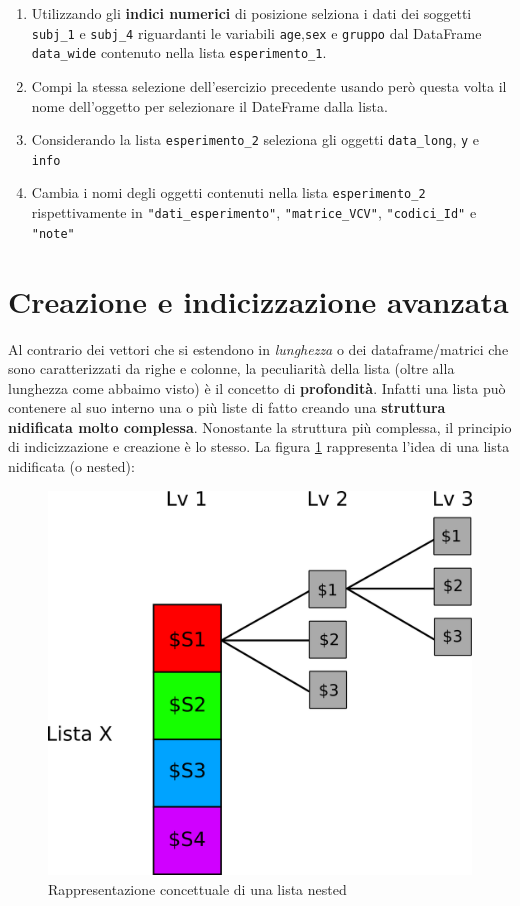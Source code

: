 \documentclass[
]{book}
\providecommand{\tightlist}{%
  \setlength{\itemsep}{0pt}\setlength{\parskip}{0pt}}
\begin{document}
\begin{enumerate}
\def\labelenumi{\arabic{enumi}.}
\tightlist
\item
  Utilizzando gli \textbf{indici numerici} di posizione selziona i dati dei soggetti \texttt{subj\_1} e \texttt{subj\_4} riguardanti le variabili \texttt{age},\texttt{sex} e \texttt{gruppo} dal DataFrame \texttt{data\_wide} contenuto nella lista \texttt{esperimento\_1}.
\item
  Compi la stessa selezione dell'esercizio precedente usando però questa volta il nome dell'oggetto per selezionare il DateFrame dalla lista.
\item
  Considerando la lista \texttt{esperimento\_2} seleziona gli oggetti \texttt{data\_long}, \texttt{y} e \texttt{info}
\item
  Cambia i nomi degli oggetti contenuti nella lista \texttt{esperimento\_2} rispettivamente in \texttt{"dati\_esperimento"}, \texttt{"matrice\_VCV"}, \texttt{"codici\_Id"} e \texttt{"note"}
\end{enumerate}

\hypertarget{creazione-e-indicizzazione-avanzata}{%
\section{Creazione e indicizzazione avanzata}\label{creazione-e-indicizzazione-avanzata}}

Al contrario dei vettori che si estendono in \emph{lunghezza} o dei dataframe/matrici che sono caratterizzati da righe e colonne, la peculiarità della lista (oltre alla lunghezza come abbaimo visto) è il concetto di \textbf{profondità}. Infatti una lista può contenere al suo interno una o più liste di fatto creando una \textbf{struttura nidificata molto complessa}. Nonostante la struttura più complessa, il principio di indicizzazione e creazione è lo stesso. La figura \ref{fig:list-depth} rappresenta l'idea di una lista nidificata (o nested):

\begin{figure}

{\centering \includegraphics[width=0.5\linewidth,height=0.5\textheight]{images/list_depth} 

}

\caption{Rappresentazione concettuale di una lista nested}\label{fig:list-depth}
\end{figure}
\end{document}
